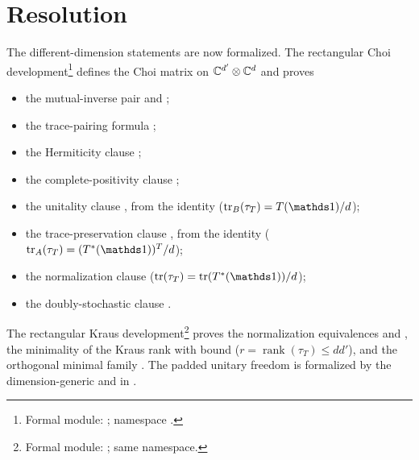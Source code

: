 \documentclass{article}
\begin{document}
\section{Resolution}

The different-dimension statements are now formalized.  The rectangular
Choi development\footnote{Formal module:
; namespace
.} defines the Choi matrix
 on $\mathbb{C}^{d'}\otimes\mathbb{C}^{d}$ and proves
\begin{itemize}
    \item the mutual-inverse pair  and
        ;
    \item the trace-pairing formula ;
    \item the Hermiticity clause
        ;
    \item the complete-positivity clause
        ;
    \item the unitality clause
        , from the identity
         ($\tr_B(\tau_T)=T(\Id)/d$);
    \item the trace-preservation clause
        , from the identity
        ($\tr_A(\tau_T)=(T^*(\Id))^{T}/d$);
    \item the normalization clause 
        ($\tr(\tau_T)=\tr(T^*(\Id))/d$);
    \item the doubly-stochastic clause
        .
\end{itemize}
The rectangular Kraus development\footnote{Formal module:
; same namespace.} proves the
normalization equivalences  and
, the minimality of the
Kraus rank  with bound
 ($r=\operatorname{rank}(\tau_T)\leq dd'$), and the
orthogonal minimal family .
The padded unitary freedom is formalized by the dimension-generic
 and 
in .
\end{document}

